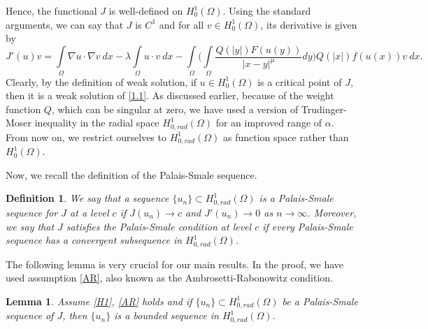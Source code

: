 \documentclass[11pt]{amsart}
\numberwithin{equation}{section}
\newtheorem{lem}[thm]{Lemma}
\newtheorem{definition}{Definition}
\newcommand{\h}{H^1_0(\Omega)}
\newcommand{\hr}{H^1_{0, rad}(\Omega)}
\newcommand{\1}{\frac{1}{2}}
\begin{document}
	Hence, the functional $J$ is well-defined on $\h$. Using the standard arguments, we can say that $J$ is $C^1$ and  for all $v \in H^1_{0}(\Omega)$, its derivative is given by
	\[   J'(u)v= \int\limits_\Omega \nabla u \cdot \nabla v\ dx- \lambda \int\limits_\Omega u \cdot v\ dx -\int\limits_\Omega \Bigg( \int\limits_\Omega \frac{Q(|y|)F(u(y))}{|x-y|^{\mu}}dy \Bigg) Q(|x|)f(u(x))v\ dx.\]
	Clearly, by the definition of weak solution, if $u \in \h$ is a critical point of $J$, then it is a weak solution of \eqref{1.1}. As discussed earlier, because of the weight function $Q$, which can be singular at zero, we have used a version of Trudinger-Moser inequality in the radial space $\hr$ for an improved range of $\alpha$. From now on, we restrict ourselves to $\hr$ as function space rather than $\h$.
	
	Now, we recall the definition of the Palais-Smale sequence.
	\begin{definition}  We say that a sequence $\{u_n\} \subset H^1_{0,rad}(\Omega)$ is a Palais-Smale sequence for $J$ at a level $c$ if $J(u_n) \rightarrow c$ and $J'(u_n) \rightarrow 0$ as $n \rightarrow \infty$. Moreover, we say that $J$ satisfies the Palais-Smale condition at level $c$ if every Palais-Smale sequence has a convergent subsequence in $H^1_{0,rad}(\Omega)$.
	\end{definition}
	The following lemma is very crucial for our main results. In the proof, we have used assumption \eqref{AR}, also known as the Ambrosetti-Rabonowitz condition.
	\begin{lem}
		\label{lem3.1}
		Assume \eqref{H1}, \eqref{AR} holds and if $\{ u_n\} \subset \hr $ be a Palais-Smale sequence of $J$, then $\{u_n\}$ is a bounded sequence in $\hr$.
	\end{lem}
\end{document}
